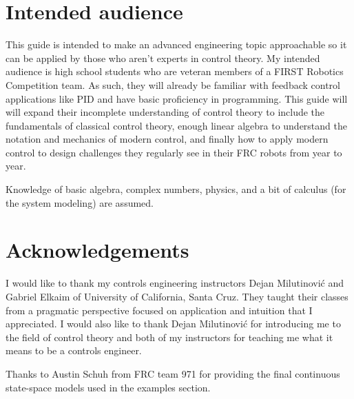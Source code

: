 \section*{Intended audience}

This guide is intended to make an advanced engineering topic approachable so it
can be applied by those who aren't experts in control theory. My intended
audience is high school students who are veteran members of a FIRST Robotics
Competition team. As such, they will already be familiar with feedback control
applications like PID and have basic proficiency in programming. This guide will
will expand their incomplete understanding of control theory to include the
fundamentals of classical control theory, enough linear algebra to understand
the notation and mechanics of modern control, and finally how to apply modern
control to design challenges they regularly see in their FRC robots from year to
year.

Knowledge of basic algebra, complex numbers, physics, and a bit of calculus (for
the system modeling) are assumed.

\section*{Acknowledgements}

I would like to thank my controls engineering instructors Dejan Milutinovi\'c
and Gabriel Elkaim of University of California, Santa Cruz. They taught their
classes from a pragmatic perspective focused on application and intuition that I
appreciated. I would also like to thank Dejan Milutinovi\'c for introducing me
to the field of control theory and both of my instructors for teaching me what
it means to be a controls engineer.

Thanks to Austin Schuh from FRC team 971 for providing the final continuous
state-space models used in the examples section.

\cleardoublepage
